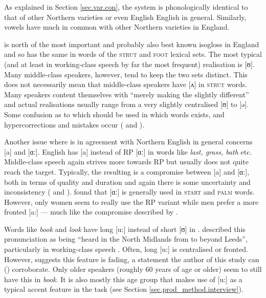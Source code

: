 As explained in Section \ref{sec.var.con}, the   system is phonologically identical to that of other Northern varieties or even English English in general.
Similarly,  vowels have much in common with other Northern varieties in England.

 is north of the most important and probably also best known isogloss in England and so has the same  in words of the \textsc{strut} and \textsc{foot} lexical sets.
The most typical (and at least in working-class speech by far the most frequent) realisation is [ʊ].
Many middle-class speakers, however, tend to keep the two sets distinct.
This does not necessarily mean that middle-class speakers have [ʌ] in \textsc{strut} words.
Many speakers content themselves with ``merely making the  slightly different'' \citep[284]{knowles1973} and actual realisations usually range from a very slightly centralised [ʊ] to [ə].
Some confusion as to which  should be used in which words exists, and hypercorrections and mistakes occur (\cite[286--287]{knowles1973} and \cite[83]{knowles1978}).

Another issue where  is in agreement with Northern English in general concerns [a] and [ɑː].
 English has [a] instead of RP [ɑː] in words like \emph{last, grass, bath} etc.
Middle-class speech again strives more towards RP but usually does not quite reach the target.
Typically, the resulting  is a compromise between [a] and [ɑː], both in terms of quality and duration and again there is some uncertainty and inconsistency (\citealp[cf.][287--289]{knowles1973} and \citeyear[83--84]{knowles1978}).
\citeauthor{watson2007} found that [ɑː] is generally used in \textsc{start} and \textsc{palm} words.
However, only women seem to really use the RP variant while men prefer a more fronted [a:] \parencite[cf.][358]{watson2007} --- much like the compromise described by \cite{knowles1973}.

Words like \emph{book} and \emph{look} have long [u:] instead of short [ʊ] in .
\citet{knowles1973} described this pronunciation as being ``heard in the North Midlands from  to beyond Leeds'', particularly in working-class speech \citep[290]{knowles1973}.
Often, long [u:] is centralised or fronted.
However, \citet[358]{watson2007} suggests this feature is fading, a statement the author of this study can () corroborate.
Only older speakers (roughly 60 years of age or older) seem to still have this  in \emph{book}.
It is also mostly this age group that makes use of [u:] as a typical accent feature in the  task (see Section \ref{sec.prod_method.interview}).

